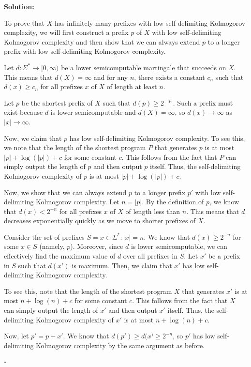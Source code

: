 \documentclass[10pt]{article}
\newenvironment{solution}{\textbf{Solution:}}{\hfill$\square$}
\begin{document}
\begin{enumerate}
    \begin{solution}

    To prove that $X$ has infinitely many prefixes with low self-delimiting Kolmogorov complexity, we will first construct a prefix $p$ of $X$ with low self-delimiting Kolmogorov complexity and then show that we can always extend $p$ to a longer prefix with low self-delimiting Kolmogorov complexity.
    
    Let $d : \Sigma^* \rightarrow [0, \infty)$ be a lower semicomputable martingale that succeeds on $X$. This means that $d(X) = \infty$ and for any $n$, there exists a constant $c_n$ such that $d(x) \geq c_n$ for all prefixes $x$ of $X$ of length at least $n$.
    
    Let $p$ be the shortest prefix of $X$ such that $d(p) \geq 2^{-|p|}$. Such a prefix must exist because $d$ is lower semicomputable and $d(X) = \infty$, so $d(x) \rightarrow \infty$ as $|x| \rightarrow \infty$.
    
    Now, we claim that $p$ has low self-delimiting Kolmogorov complexity. To see this, we note that the length of the shortest program $P$ that generates $p$ is at most $|p| + \log(|p|) + c$ for some constant $c$. This follows from the fact that $P$ can simply output the length of $p$ and then output $p$ itself. Thus, the self-delimiting Kolmogorov complexity of $p$ is at most $|p| + \log(|p|) + c$.
    
    Now, we show that we can always extend $p$ to a longer prefix $p'$ with low self-delimiting Kolmogorov complexity. Let $n = |p|$. By the definition of $p$, we know that $d(x) < 2^{-n}$ for all prefixes $x$ of $X$ of length less than $n$. This means that $d$ decreases exponentially quickly as we move to shorter prefixes of $X$.
    
    Consider the set of prefixes $S = {x \in \Sigma^* : |x| = n}$. We know that $d(x) \geq 2^{-n}$ for some $x \in S$ (namely, $p$). Moreover, since $d$ is lower semicomputable, we can effectively find the maximum value of $d$ over all prefixes in $S$. Let $x'$ be a prefix in $S$ such that $d(x')$ is maximum. Then, we claim that $x'$ has low self-delimiting Kolmogorov complexity.
    
    To see this, note that the length of the shortest program $X$ that generates $x'$ is at most $n + \log(n) + c$ for some constant $c$. This follows from the fact that $X$ can simply output the length of $x'$ and then output $x'$ itself. Thus, the self-delimiting Kolmogorov complexity of $x'$ is at most $n + \log(n) + c$.\
    
    Now, let $p' = p + x'$. We know that $d(p') \geq d(x^) \geq 2^{-n}$, so $p'$ has low self-delimiting Kolmogorov complexity by the same argument as before.
    
    \end{solution}
    
\end{enumerate}
\end{document}

